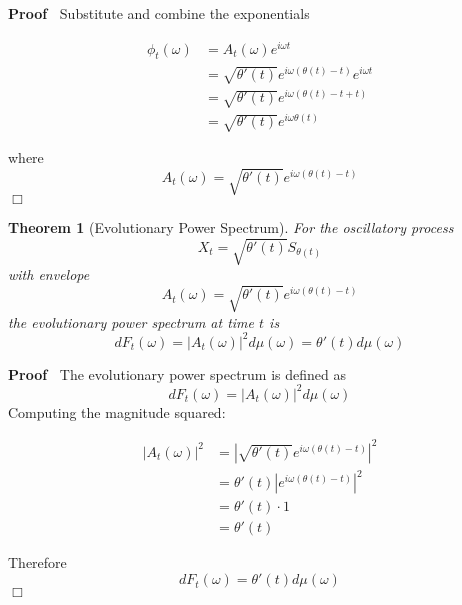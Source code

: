 \documentclass{article}
\newenvironment{proof}{\noindent\textbf{Proof\ }}{\hspace*{\fill}$\Box$\medskip}
\newtheorem{theorem}{Theorem}
\begin{document}
\begin{proof}
  Substitute and combine the exponentials
  
  \begin{align}
    \phi_t (\omega) & = A_t (\omega) e^{i \omega t} \\
    & = \sqrt{\theta' (t)} e^{i \omega (\theta (t) - t)} e^{i \omega t} \\
    & = \sqrt{\theta' (t)} e^{i \omega (\theta (t) - t + t)} \\
    & = \sqrt{\theta' (t)} e^{i \omega \theta (t)} \nonumber
  \end{align}
  
  where
  \begin{equation}
    A_t (\omega) = \sqrt{\theta' (t)} e^{i \omega (\theta (t) - t)}
  \end{equation}
\end{proof}

\begin{theorem}
  [Evolutionary Power Spectrum] For the oscillatory process
  \begin{equation}
    X_t = \sqrt{\theta' (t)} S_{\theta (t)}
  \end{equation}
  with envelope
  \begin{equation}
    A_t (\omega) = \sqrt{\theta' (t)} e^{i \omega (\theta (t) - t)}
  \end{equation}
  the evolutionary power spectrum at time $t$ is
  \begin{equation}
    dF_t (\omega) = |A_t (\omega) |^2 d \mu (\omega) = \theta' (t) d \mu
    (\omega)
  \end{equation}
\end{theorem}

\begin{proof}
  The evolutionary power spectrum is defined as
  \begin{equation}
    dF_t (\omega) = |A_t (\omega) |^2 d \mu (\omega)
  \end{equation}
  Computing the magnitude squared:
  
  \begin{align}
    |A_t (\omega) |^2 & = \left| \sqrt{\theta' (t)} e^{i \omega (\theta (t) -
    t)} \right|^2 \\
    & = \theta' (t) | e^{i \omega (\theta (t) - t)} |^2 \\
    & = \theta' (t) \cdot 1 \\
    & = \theta' (t) 
  \end{align}
  
  Therefore
  \begin{equation}
    dF_t (\omega) = \theta' (t) d \mu (\omega)
  \end{equation}
\end{proof}
\end{document}
